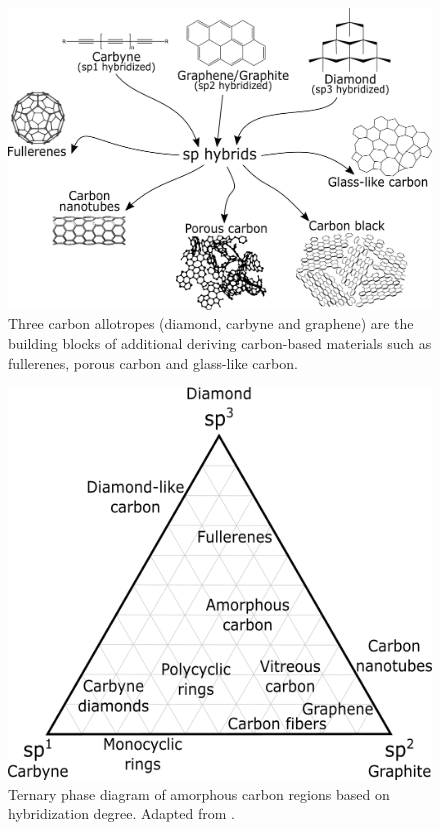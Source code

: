 \begin{figure}[!th]
\centering
\includegraphics[scale=0.30]{./Figures/carbonAllotropes.png}
\decoRule
\caption[Carbon sp-hybrid Nano-materials]{Three carbon allotropes (diamond, carbyne and graphene) are the building blocks of additional deriving carbon-based materials such as fullerenes, porous carbon and glass-like carbon.}
\label{fig:carbonAllotropes}
\end{figure}

\begin{figure}[!th]
\centering
\includegraphics[scale=0.65]{./Figures/carbonAllotropesHybridization.png}
\decoRule
\caption[Ternary Diagram of Carbon Allotropes based on sp Content]{Ternary phase diagram of amorphous carbon regions based on hybridization degree. Adapted from \cite{Heersche2007, Heimann1997, Belenkov2003, Fedel2013, Razeghi2019, AlstrupJensen2015, Vajtai2013}.}
\label{fig:carbonAllotropesDiagram}
\end{figure}

